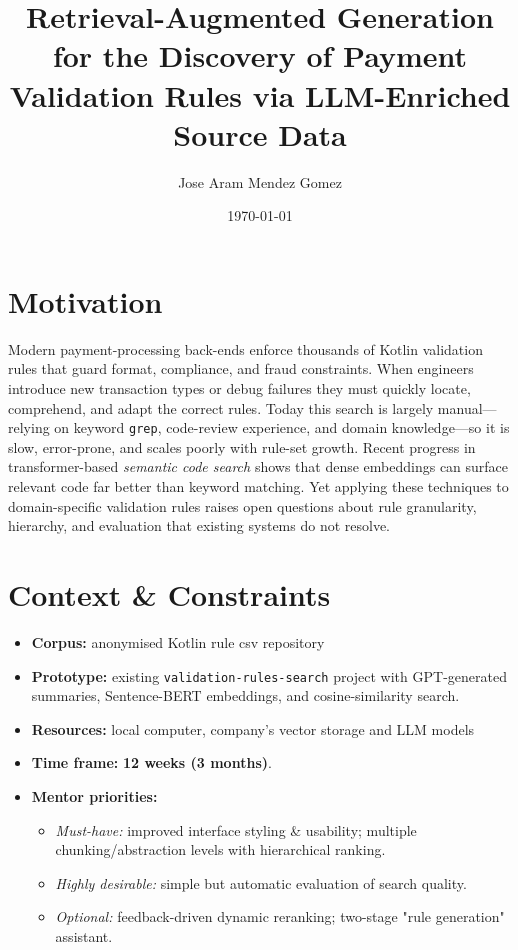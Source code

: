 \documentclass[12pt,a4paper]{article}
\title{\textbf{Retrieval-Augmented Generation for the Discovery of Payment Validation Rules via LLM-Enriched Source Data}}
\author{Jose Aram Mendez Gomez}
\date{\today}
\begin{document}
\maketitle

\section*{Motivation}
Modern payment-processing back-ends enforce thousands of Kotlin validation rules that guard format, compliance, and fraud constraints. When engineers introduce new transaction types or debug failures they must quickly locate, comprehend, and adapt the correct rules. Today this search is largely manual—relying on keyword \texttt{grep}, code-review experience, and domain knowledge—so it is slow, error-prone, and scales poorly with rule-set growth. Recent progress in transformer-based \emph{semantic code search} shows that dense embeddings can surface relevant code far better than keyword matching. Yet applying these techniques to domain-specific validation rules raises open questions about rule granularity, hierarchy, and evaluation that existing systems do not resolve.

\section*{Context \& Constraints}
\begin{itemize}
  \item \textbf{Corpus:} anonymised Kotlin rule csv repository
  \item \textbf{Prototype:} existing \texttt{validation-rules-search} project with GPT-generated summaries, Sentence-BERT embeddings, and cosine-similarity search.
  \item \textbf{Resources:} local computer, company's vector storage and LLM models
  \item \textbf{Time frame:} \textbf{12 weeks (3 months)}.
  \item \textbf{Mentor priorities:}
    \begin{itemize}
      \item \emph{Must-have:} improved interface styling \& usability; multiple chunking/abstraction levels with hierarchical ranking.
      \item \emph{Highly desirable:} simple but automatic evaluation of search quality.
      \item \emph{Optional:} feedback-driven dynamic reranking; two-stage "rule generation" assistant.
    \end{itemize}
\end{itemize}
\end{document}

